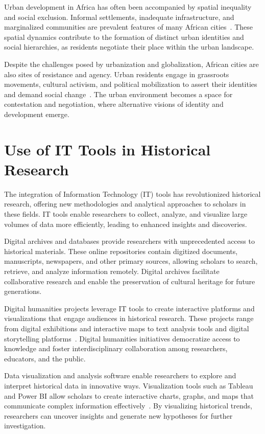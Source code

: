 Urban development in Africa has often been accompanied by spatial inequality and social exclusion. Informal settlements, inadequate infrastructure, and marginalized communities are prevalent features of many African cities~\cite{falola2008history}. These spatial dynamics contribute to the formation of distinct urban identities and social hierarchies, as residents negotiate their place within the urban landscape.

Despite the challenges posed by urbanization and globalization, African cities are also sites of resistance and agency. Urban residents engage in grassroots movements, cultural activism, and political mobilization to assert their identities and demand social change~\cite{Onilude}. The urban environment becomes a space for contestation and negotiation, where alternative visions of identity and development emerge.

\section{Use of IT Tools in Historical Research}
The integration of Information Technology (IT) tools has revolutionized historical research, offering new methodologies and analytical approaches to scholars in these fields. IT tools enable researchers to collect, analyze, and visualize large volumes of data more efficiently, leading to enhanced insights and discoveries.

Digital archives and databases provide researchers with unprecedented access to historical materials. These online repositories contain digitized documents, manuscripts, newspapers, and other primary sources, allowing scholars to search, retrieve, and analyze information remotely. Digital archives facilitate collaborative research and enable the preservation of cultural heritage for future generations.

Digital humanities projects leverage IT tools to create interactive platforms and visualizations that engage audiences in historical research. These projects range from digital exhibitions and interactive maps to text analysis tools and digital storytelling platforms~\cite{Bolstad}. Digital humanities initiatives democratize access to knowledge and foster interdisciplinary collaboration among researchers, educators, and the public.

Data visualization and analysis software enable researchers to explore and interpret historical data in innovative ways. Visualization tools such as Tableau and Power BI allow scholars to create interactive charts, graphs, and maps that communicate complex information effectively~\cite{Few}. By visualizing historical trends, researchers can uncover insights and generate new hypotheses for further investigation.
